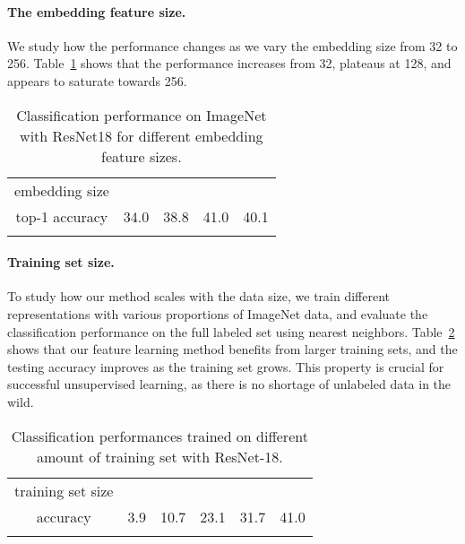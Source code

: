 \vspace{-9pt}
\paragraph{The embedding feature size.}
We study how the performance changes as  we vary the embedding size from 32 to 256.
Table~\ref{table:feat_size} shows that the performance increases from 32, plateaus at 128, and appears to saturate towards 256.

\begin{table}[t]
\centering
\begin{tabular}{c|c|c|c|c}
\Xhline{2\arrayrulewidth}
embedding size &  &  &  &  \\
\Xhline{2\arrayrulewidth}
top-1 accuracy & 34.0 & 38.8 & 41.0 & 40.1\\
\Xhline{2\arrayrulewidth}
\end{tabular}
\caption{\small
Classification performance on ImageNet with ResNet18 for different embedding feature sizes.
}
\label{table:feat_size}
\vspace{-9pt}
\end{table}

\vspace{-9pt}
\paragraph{Training set size.}
To study how our method scales with the data size,
we train different representations with various proportions of ImageNet data,
and evaluate the classification performance on
the full labeled set using nearest neighbors.
Table~\ref{table:data_scale} shows that our feature learning method benefits from larger
training sets, and the testing accuracy improves as the training set grows.
This property is crucial for successful unsupervised learning, as there is no shortage of unlabeled data in the wild.

\begin{table}[t]
	\centering
	\begin{tabular}{c|c |c|c|c|c}
		\Xhline{2\arrayrulewidth}
		training set size &  &  &  &  &  \\
		\Xhline{2\arrayrulewidth}
		accuracy & 3.9 & 10.7 & 23.1 &  31.7 & 41.0 \\
		\Xhline{2\arrayrulewidth}
	\end{tabular}
	\caption{\small
		Classification performances
		trained on different amount of training set
with ResNet-18.
	}
	\label{table:data_scale}
\vspace{-9pt}
\end{table}

